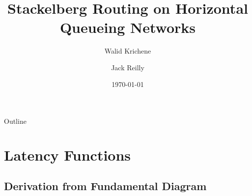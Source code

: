 \documentclass[xcolor=svgnames, english, smaller]{beamer}
\theoremstyle{plain}
\theoremstyle{definition}
\theoremstyle{plain}
\theoremstyle{plain}
\begin{document}
\title{Stackelberg Routing on Horizontal Queueing Networks}
\author{Walid Krichene \and Jack Reilly}
\institute{}
\date{\today}


\begin{frame}
\titlepage
\end{frame}

\begin{frame}{Outline}
\tableofcontents
\end{frame}


\section{Latency Functions}

\subsection{Derivation from Fundamental Diagram}
\end{document}
